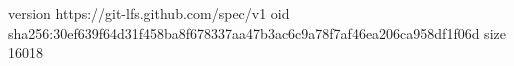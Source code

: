 version https://git-lfs.github.com/spec/v1
oid sha256:30ef639f64d31f458ba8f678337aa47b3ac6c9a78f7af46ea206ca958df1f06d
size 16018

